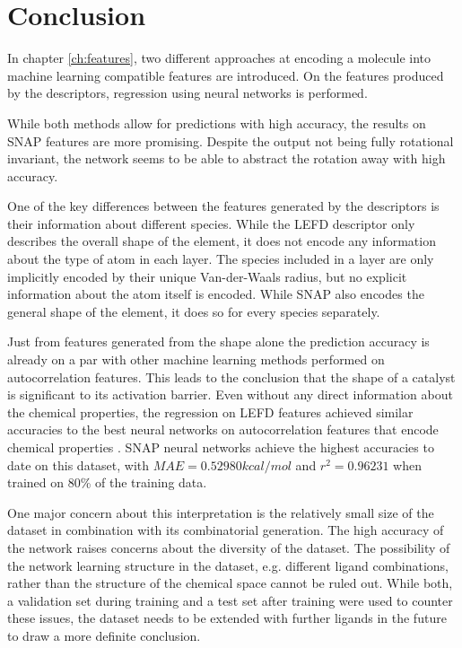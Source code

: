 
\chapter{Conclusion}
\label{ch:Conclusion}
In chapter \ref{ch:features}, two different approaches at encoding a molecule into machine learning compatible features are introduced.
On the features produced by the descriptors, regression using neural networks is performed.

While both methods allow for predictions with high accuracy, the results on SNAP features are more promising.
Despite the output not being fully rotational invariant, the network seems to be able to abstract the rotation away with high accuracy.

One of the key differences between the features generated by the descriptors is their information about 
different species.
While the LEFD descriptor only describes the overall shape of the element, it does not encode any information about the 
type of atom in each layer.
The species included in a layer are only implicitly encoded by their unique Van-der-Waals radius, but no explicit information about the 
atom itself is encoded.
While SNAP also encodes the general shape of the element, it does so for every species separately.

Just from features generated from the shape alone the prediction accuracy is already on a par with other machine learning methods performed on autocorrelation features.
This leads to the conclusion that the shape of a catalyst is significant to its activation barrier.
Even without any direct information about the chemical properties, the regression on LEFD features achieved similar accuracies to
the best neural networks on autocorrelation features that encode chemical properties \cite{friederich_dos}.
SNAP neural networks achieve the highest accuracies to date on this dataset, with 
$MAE = 0.52980 kcal/mol$ and $r^2=0.96231$ when trained on 80\% of the training data.

One major concern about this interpretation is the relatively small size of the dataset in combination 
with its combinatorial generation.
The high accuracy of the network raises concerns about the diversity of the dataset.
The possibility of the network learning structure in the dataset, e.g. different ligand combinations,
rather than the structure of the chemical space cannot be ruled out.
While both, a validation set during training and a test set after training were used to counter these issues,
the dataset needs to be extended with further ligands in the future to draw a more definite conclusion.

